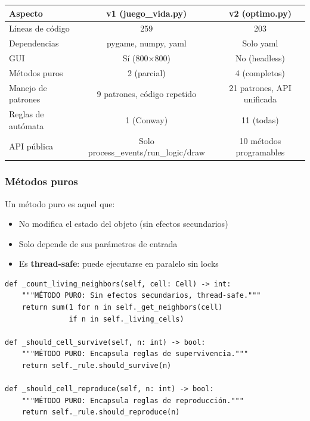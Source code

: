 \documentclass[12pt,a4paper]{article}
\begin{document}
\begin{table}[h]
\centering
\begin{tabular}{lcc}
\toprule
\textbf{Aspecto} & \textbf{v1 (juego\_vida.py)} & \textbf{v2 (optimo.py)} \\
\midrule
Líneas de código         & 259 & 203 \\
Dependencias             & pygame, numpy, yaml & Solo yaml \\
GUI                     & Sí (800$\times$800) & No (headless) \\
Métodos puros           & 2 (parcial) & 4 (completos) \\
Manejo de patrones      & 9 patrones, código repetido & 21 patrones, API unificada \\
Reglas de autómata      & 1 (Conway) & 11 (todas) \\
API pública             & Solo process\_events/run\_logic/draw & 10 métodos programables \\
\bottomrule
\end{tabular}
\end{table}

\subsubsection{Métodos puros}

Un método puro es aquel que:
\begin{itemize}
  \item No modifica el estado del objeto (sin efectos secundarios)
  \item Solo depende de sus parámetros de entrada
  \item Es \textbf{thread-safe}: puede ejecutarse en paralelo sin locks
\end{itemize}

\begin{lstlisting}
def _count_living_neighbors(self, cell: Cell) -> int:
    """MÉTODO PURO: Sin efectos secundarios, thread-safe."""
    return sum(1 for n in self._get_neighbors(cell)
               if n in self._living_cells)

def _should_cell_survive(self, n: int) -> bool:
    """MÉTODO PURO: Encapsula reglas de supervivencia."""
    return self._rule.should_survive(n)

def _should_cell_reproduce(self, n: int) -> bool:
    """MÉTODO PURO: Encapsula reglas de reproducción."""
    return self._rule.should_reproduce(n)
\end{lstlisting}
\end{document}

